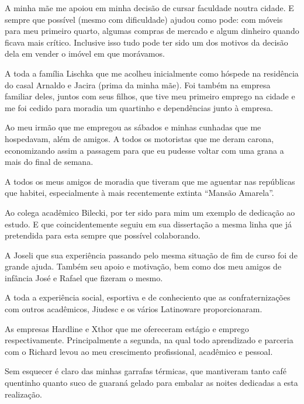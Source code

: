 
A minha mãe me apoiou em minha decisão de cursar faculdade noutra cidade. E sempre que possível (mesmo com dificuldade) ajudou como pode: com móveis para meu primeiro quarto, algumas compras de mercado e algum dinheiro quando ficava mais crítico. Inclusive isso tudo pode ter sido um dos motivos da decisão dela em vender o imóvel em que morávamos.

A toda a família Lischka que me acolheu inicialmente como hóspede na residência do casal Arnaldo e Jacira (prima da minha mãe). Foi também na empresa familiar deles, juntos com seus filhos, que tive meu primeiro emprego na cidade e me foi cedido para moradia um quartinho e dependências junto à empresa.

Ao meu irmão que me empregou as sábados e minhas cunhadas que me hospedavam, além de amigos. A todos os motoristas que me deram carona, economizando assim a passagem para que eu pudesse voltar com uma grana a mais do final de semana.

A todos os meus amigos de moradia que tiveram que me aguentar nas repúblicas que habitei, especialmente à mais recentemente extinta ``Mansão Amarela''.

Ao colega acadêmico Bilecki, por ter sido para mim um exemplo de dedicação ao estudo. E que coincidentemente seguiu em sua dissertação a mesma linha que já pretendida para esta sempre que possível colaborando.

A Joseli que sua experiência passando pelo mesma situação de fim de curso foi de grande ajuda. Também seu apoio e motivação, bem como dos meu amigos de infância José e Rafael que fizeram o mesmo.

A toda a experiência social, esportiva e de conheciento que as confraternizações com outros acadêmicos, Jiudesc e os vários Latinoware proporcionaram.

As empresas Hardline e Xthor que me ofereceram estágio e emprego respectivamente. Principalmente a segunda, na qual todo aprendizado e parceria com o Richard levou ao meu crescimento profissional, acadêmico e pessoal.

Sem esquecer é claro das minhas garrafas térmicas, que mantiveram tanto café quentinho quanto suco de guaraná gelado para embalar as noites dedicadas a esta realização.
